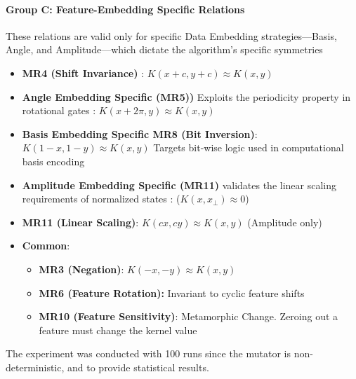\documentclass[12pt,a4paper]{article}
\begin{document}
	\paragraph{Group C: Feature-Embedding Specific Relations}
	These relations are valid only for specific Data Embedding strategies—Basis, Angle, and Amplitude—which dictate the algorithm's specific symmetries \cite{zaman2025surveyquantummachinelearning, schuld2018}
	\begin{itemize}
		
		\item \textbf{MR4 (Shift Invariance)} \cite{havlicek2019}:  $K(x+c, y+c) \approx K(x,y)$ 
		
		\item \textbf{Angle Embedding Specific (MR5))} Exploits the periodicity property in rotational gates \cite{Sweke2020, havlicek2019}: $K(x+2\pi, y) \approx K(x,y)$
		
		\item \textbf{Basis Embedding Specific MR8 (Bit Inversion)}: $K(1-x, 1-y) \approx K(x,y)$ Targets bit-wise logic used in computational basis encoding \cite{Dwarakanath2018}
		
		\item \textbf{Amplitude Embedding Specific (MR11)} validates the linear scaling requirements of normalized states \cite{mottonen2004}: ($K(x, x_{\perp}) \approx 0$)
			
		\item \textbf{MR11 (Linear Scaling)}: $K(cx, cy) \approx K(x,y)$ (Amplitude only) \cite{mottonen2004}
			
		\item \textbf{Common}:
			\begin{itemize}
			\item \textbf{MR3 (Negation)}: $K(-x,-y) \approx K(x,y)$ \cite{xie2011}
			
			\item \textbf{MR6 (Feature Rotation):} Invariant to cyclic feature shifts \cite{LaRose2020}
			
			\item \textbf{MR10 (Feature Sensitivity)}: Metamorphic Change. Zeroing out a feature must change the kernel value \cite{Segura2016}

			\end{itemize}
	\end{itemize}
	
	The experiment was conducted with 100 runs since the mutator is non-deterministic, and to provide statistical results.
	
\end{document}
